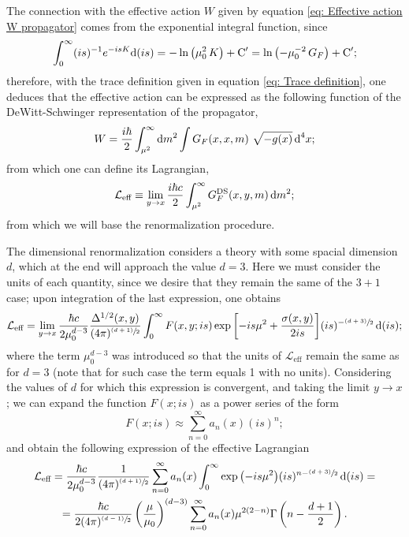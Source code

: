 The connection with the effective action $W$ given by equation \ref{eq: Effective action W propagator} comes from the exponential integral function, since
\begin{equation}
	\int_0^\infty(is)^{-1}e^{-is K}\text{d}(is)=-\ln\left(\mu_0^2\,K\right)+\text{C}'=\ln\left(-\mu^{-2}_0\,G_F\right)+\text{C}';
\end{equation}
therefore, with the trace definition given in equation \ref{eq: Trace definition}, one deduces that the effective action can be expressed as the following function of the DeWitt-Schwinger representation of the propagator,
\begin{equation}
	W=\frac{i\hbar}{2}  \int_{\mu^2}^\infty \text{d} m^2\int G_F(x,x,m)\,\,\sqrt{-g(x)}\,\text{d}^4x;
\end{equation}
from which one can define its Lagrangian,
\begin{equation}
	\mathcal{L}_{\text{eff}}\equiv \lim\limits_{y\to x}\frac{i\hbar c}{2}\int_{\mu^2}^\infty G_F^{\text{DS}}(x,y, m)\,\text{d} m^2;
\end{equation}
from which we will base the renormalization procedure.


The dimensional renormalization considers a theory with some spacial dimension $d$, which at the end will approach the value $d=3$. Here we must consider the units of each quantity, since we desire that they remain the same of the $3+1$ case; upon integration of the last expression, one obtains 
\begin{equation}
	\mathcal{L}_{\text{eff}}=\lim\limits_{y\to x}\frac{\hbar c}{2\mu_0^{d-3}}\frac{\Delta^{1/2}(x,y)}{(4\pi)^{\sfrac{(d+1)}{2}}}\int^\infty_0F(x,y;is)\exp{\left[-is\mu^2+\frac{\sigma(x,y)}{2is}\right]}(is)^{-\sfrac{(d+3)}{2}}\,\text{d} (is);
\end{equation}
where the term $\mu_0^{d-3}$ was introduced so that the units of $\mathcal{L}_{\text{eff}}$ remain the same as for $d=3$ (note that for such case the term equals 1 with no units). Considering the values of $d$ for which this expression is convergent, and taking the limit $y\to x$; we can expand the function $F(x;is)$ as a power series of the form
\begin{equation}
	F(x;is)\approx \sum_{n=0}^\infty a_n(x)(is)^n;
\end{equation}
and obtain the following expression of the effective Lagrangian
\begin{multline}\label{eq: Effective lagrangian Gamma}
	\mathcal{L}_{\text{eff}}=\frac{\hbar c}{2\mu_0^{d-3}}\frac{1}{(4\pi)^{\sfrac{(d+1)}{2}}}\sum_{n=0}^\infty a_n(x)\int^\infty_0\exp{\left(-is\mu^2\right)}(is)^{n-\sfrac{(d+3)}{2}}\,\text{d} (is)=\\
	=\frac{\hbar c}{2(4\pi)^{\sfrac{(d-1)}{2}}}\left(\frac{\mu}{\mu_0}\right)^{(d-3)}\sum_{n=0}^{\infty}a_n(x)\mu^{2(2-n)}\Gamma\left(n-\frac{d+1}{2}\right).
\end{multline}

